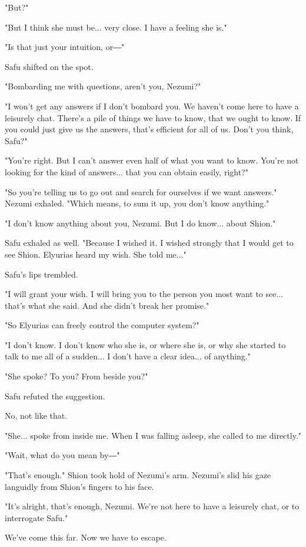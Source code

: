 "But?"

"But I think she must be... very close. I have a feeling she is."

"Is that just your intuition, or―"

Safu shifted on the spot.

"Bombarding me with questions, aren't you, Nezumi?"

"I won't get any answers if I don't bombard you. We haven't come here to
have a leisurely chat. There's a pile of things we have to know, that we
ought to know. If you could just give us the answers, that's efficient
for all of us. Don't you think, Safu?"

"You're right. But I can't answer even half of what you want to know.
You're not looking for the kind of answers... that you can obtain
easily, right?"

"So you're telling us to go out and search for ourselves if we want
answers." Nezumi exhaled. "Which means, to sum it up, you don't know
anything."

"I don't know anything about you, Nezumi. But I do know... about Shion."

Safu exhaled as well. "Because I wished it. I wished strongly that I
would get to see Shion. Elyurias heard my wish. She told me..."

Safu's lips trembled.

"I will grant your wish. I will bring you to the person you most want to
see... that's what she said. And she didn't break her promise."

"So Elyurias can freely control the computer system?"

"I don't know. I don't know who she is, or where she is, or why she
started to talk to me all of a sudden... I don't have a clear idea... of
anything."

"She spoke? To you? From beside you?"

Safu refuted the suggestion.

No, not like that.

"She... spoke from inside me. When I was falling asleep, she called to
me directly."

"Wait, what do you mean by―"

"That's enough." Shion took hold of Nezumi's arm. Nezumi's slid his gaze
languidly from Shion's fingers to his face.

"It's alright, that's enough, Nezumi. We're not here to have a leisurely
chat, or to interrogate Safu."

We've come this far. Now we have to escape.

